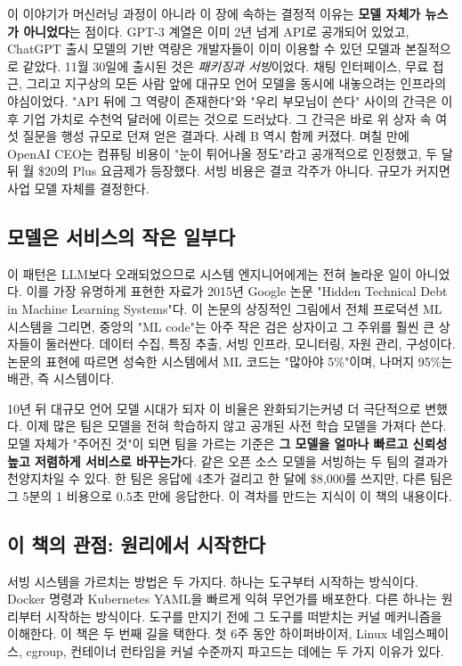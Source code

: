 이 이야기가 머신러닝 과정이 아니라 이 장에 속하는 결정적 이유는 \textbf{모델 자체가 뉴스가 아니었다}는 점이다. GPT-3 계열은 이미 2년 넘게 API로 공개되어 있었고, ChatGPT 출시 모델의 기반 역량은 개발자들이 이미 이용할 수 있던 모델과 본질적으로 같았다. 11월 30일에 출시된 것은 \textit{패키징과 서빙}이었다. 채팅 인터페이스, 무료 접근, 그리고 지구상의 모든 사람 앞에 대규모 언어 모델을 동시에 내놓으려는 인프라의 야심이었다. "API 뒤에 그 역량이 존재한다"와 "우리 부모님이 쓴다" 사이의 간극은 이후 기업 가치로 수천억 달러에 이르는 것으로 드러났다. 그 간극은 바로 위 상자 속 여섯 질문을 행성 규모로 던져 얻은 결과다. 사례 B 역시 함께 커졌다. 며칠 만에 OpenAI CEO는 컴퓨팅 비용이 "눈이 튀어나올 정도"라고 공개적으로 인정했고, 두 달 뒤 월 \$20의 Plus 요금제가 등장했다. 서빙 비용은 결코 각주가 아니다. 규모가 커지면 사업 모델 자체를 결정한다.

\subsection*{모델은 서비스의 작은 일부다}

이 패턴은 LLM보다 오래되었으므로 시스템 엔지니어에게는 전혀 놀라운 일이 아니었다. 이를 가장 유명하게 표현한 자료가 2015년 Google 논문 "Hidden Technical Debt in Machine Learning Systems"다. 이 논문의 상징적인 그림에서 전체 프로덕션 ML 시스템을 그리면, 중앙의 "ML code"는 아주 작은 검은 상자이고 그 주위를 훨씬 큰 상자들이 둘러싼다. 데이터 수집, 특징 추출, 서빙 인프라, 모니터링, 자원 관리, 구성이다. 논문의 표현에 따르면 성숙한 시스템에서 ML 코드는 "많아야 5\%"이며, 나머지 95\%는 배관, 즉 시스템이다.

10년 뒤 대규모 언어 모델 시대가 되자 이 비율은 완화되기는커녕 더 극단적으로 변했다. 이제 많은 팀은 모델을 전혀 학습하지 않고 공개된 사전 학습 모델을 가져다 쓴다. 모델 자체가 "주어진 것"이 되면 팀을 가르는 기준은 \textbf{그 모델을 얼마나 빠르고 신뢰성 높고 저렴하게 서비스로 바꾸는가}다. 같은 오픈 소스 모델을 서빙하는 두 팀의 결과가 천양지차일 수 있다. 한 팀은 응답에 4초가 걸리고 한 달에 \$8,000를 쓰지만, 다른 팀은 그 5분의 1 비용으로 0.5초 만에 응답한다. 이 격차를 만드는 지식이 이 책의 내용이다.

\subsection*{이 책의 관점: 원리에서 시작한다}

서빙 시스템을 가르치는 방법은 두 가지다. 하나는 도구부터 시작하는 방식이다. Docker 명령과 Kubernetes YAML을 빠르게 익혀 무언가를 배포한다. 다른 하나는 원리부터 시작하는 방식이다. 도구를 만지기 전에 그 도구를 떠받치는 커널 메커니즘을 이해한다. 이 책은 두 번째 길을 택한다. 첫 6주 동안 하이퍼바이저, Linux 네임스페이스, cgroup, 컨테이너 런타임을 커널 수준까지 파고드는 데에는 두 가지 이유가 있다.

